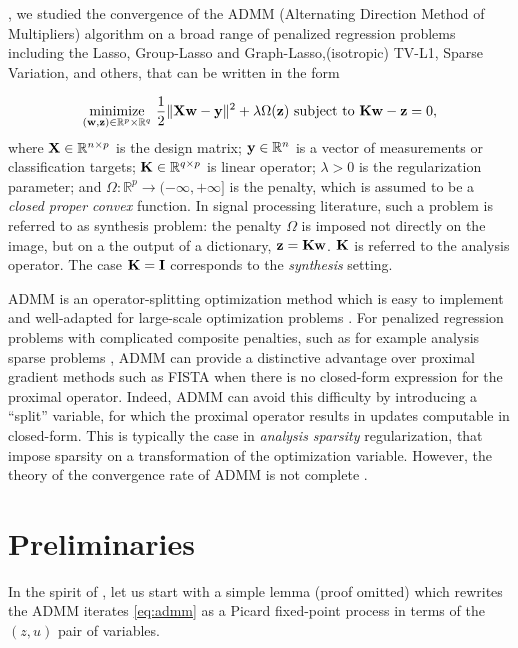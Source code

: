   \citep{dohmatob2015local}, we studied the convergence of
the ADMM (Alternating Direction Method of Multipliers) algorithm on a broad range of penalized
regression problems including the Lasso, Group-Lasso and Graph-Lasso,(isotropic)
TV-L1, Sparse Variation, and others, that can be written in the form

\begin{equation}
  \underset{(\mathbf{w},\mathbf{z}) \in \mathbb{R}^p \times
    \mathbb{R}^q}{\text{minimize}}\text{ }\frac{1}{2}\|\mathbf{X}\mathbf{w}-\mathbf{y}\|^2 +
  \lambda\Omega(\mathbf{z}) \text{ subject to }\mathbf{K}\mathbf{w}
    - \mathbf{z} = 0,
  \label{eq:main_pb}
\end{equation}
where $\mathbf{X} \in \mathbb{R}^{n \times  p}$ is the design matrix; $\mathbf{y} \in
\mathbb{R}^n$ is a vector of measurements or classification targets; 
$\mathbf{K}\in\mathbb{R}^{q \times p}$ is linear operator;  $\lambda > 0$ is the
regularization parameter;
and $\Omega: \mathbb{R}^p \rightarrow (-\infty, +\infty]$ is
    the penalty, which is assumed to be a \textit{closed proper
      convex} function.
    In signal processing literature, such a problem is referred to as synthesis problem: the penalty $\Omega$ is imposed not directly on the image, but on a the output of a dictionary, $\mathbf{z} = \mathbf{K}\mathbf{w}$. $\mathbf{K}$ is referred to the analysis operator. The case $\mathbf{K} = \mathbf{I}$ corresponds to the \textit{synthesis} setting.

    ADMM
    \citep{glowinski1975approximation,gabay1976dual,eckstein1992douglas} is
an operator-splitting optimization method which is easy to implement and 
well-adapted for large-scale optimization problems
\citep{boyd2011distributed}. For penalized regression problems with
complicated composite penalties, such as for example analysis sparse
problems \citep{vaiter2013robust},  ADMM can provide a distinctive advantage
over proximal gradient methods such as FISTA \citep{beck09fista} 
when there is no closed-form expression for the 
proximal operator. Indeed, ADMM can
avoid this difficulty by introducing a ``split'' variable, for which the
proximal operator results in updates computable in closed-form.
This is typically the case in \emph{analysis sparsity} regularization,
that impose sparsity on a transformation of the optimization variable. 
However, the theory of the convergence rate of ADMM is
not complete \citep{boyd2011distributed}.


\section{Preliminaries}
In the spirit of \citep{ghadimi2013optimal},
let us start with a simple lemma (proof omitted) which
rewrites the ADMM iterates \eqref{eq:admm} as a Picard fixed-point
process in terms of the $(z, u)$ pair of variables.%

